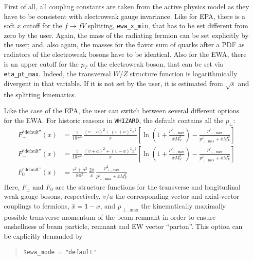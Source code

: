 \documentclass[12pt]{book}
\newcommand{\ttt}[1]{\texttt{#1}}
\newcommand{\whizard}{\ttt{WHIZARD}}
\begin{document}
First of all, all coupling constants are taken from the active physics
model as they have to be consistent with electroweak gauge
invariance. Like for EPA, there is a soft $x$ cutoff for the $f \to f
V$ splitting, \ttt{ewa\_x\_min}, that has to be set different from
zero by the user. Again, the mass of the radiating fermion can be set
explicitly by the user; and, also again, the masses for the flavor sum
of quarks after a PDF as radiators of the electroweak bosons have to
be identical. Also for the EWA, there is an upper cutoff for the $p_T$
of the electroweak boson, that can be set via
\ttt{eta\_pt\_max}. Indeed, the transversal $W$/$Z$ structure function
is logarithmically divergent in that variable. If it is not set by the
user, it is estimated from $\sqrt{s}$ and the splitting kinematics.

Like the case of the EPA, the user can switch between several
different options for the EWA. For historic reasons in \whizard, the
default contains all the $p_\perp$:
\begin{align}
  \label{eq:ewa_default}
  F^{\text{``default''}}_{+}(x) &= \frac{1}{16\pi^2}\,\frac{(v-a)^2 + (v+a)^2\bar x^2}{x}
  \left[
  \ln\left(1 + \frac{p_{\perp,\textrm{max}}^2}{\bar x M_V^2}\right)
  -
  \frac{p_{\perp,\textrm{max}}^2}{p_{\perp,\textrm{max}}^2 + \bar x M_V^2}
  \right]
  \\
  F^{\text{``default''}}_{-}(x) &= \frac{1}{16\pi^2}\,\frac{(v+a)^2 + (v-a)^2\bar x^2}{x}
  \left[
  \ln\left(1 + \frac{p_{\perp,\textrm{max}}^2}{\bar x M_V^2}\right)
  -
  \frac{p_{\perp,\textrm{max}}^2}{p_{\perp,\textrm{max}}^2 + \bar x M_V^2}
  \right]
  \\
  F^{\text{``default''}}_0(x) &= \frac{v^2+a^2}{8\pi^2}\,\frac{2\bar x}{x}\,
  \frac{p_{\perp,\textrm{max}}^2}{p_{\perp,\textrm{max}}^2 + \bar x M_V^2}
\end{align}
Here, $F_\pm$ and $F_0$ are the structure functions for the transverse
and longitudinal weak gauge bosons, respectively, $v/a$ the
corresponding vector and axial-vector couplings to fermions, $\bar x =
1 - x$, and $p_{\perp,\textrm{max}}$ the kinematically maximally possible
transverse momentum of the beam remnant in order to ensure onshellness
of beam particle, remnant and EW vector ``parton''. This option can be
explicitly demanded by
\begin{quote}
\begin{footnotesize}
\begin{Verbatim}
$ewa_mode = "default"
\end{Verbatim}
\end{footnotesize}
\end{quote}
\end{document}
